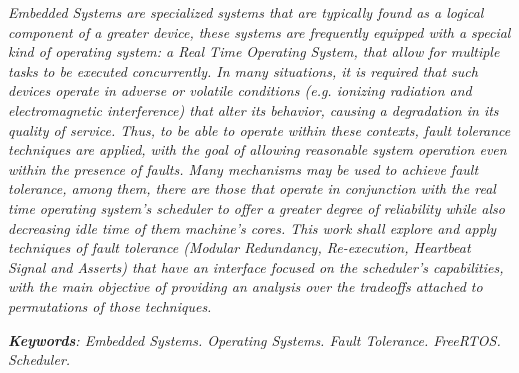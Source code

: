 \begin{Abstract}

\textit{Embedded Systems are specialized systems that are typically found as a logical component of a greater device, these systems are frequently equipped with a special kind of operating system: a Real Time Operating System, that allow for multiple tasks to be executed concurrently. In many situations, it is required that such devices operate in adverse or volatile conditions (e.g. ionizing radiation and electromagnetic interference) that alter its behavior, causing a degradation in its quality of service. Thus, to be able to operate within these contexts, fault tolerance techniques are applied, with the goal of allowing reasonable system operation even within the presence of faults. Many mechanisms may be used to achieve fault tolerance, among them, there are those that operate in conjunction with the real time operating system's scheduler to offer a greater degree of reliability while also decreasing idle time of them machine's cores. This work shall explore and apply techniques of fault tolerance (Modular Redundancy, Re-execution, Heartbeat Signal and Asserts) that have an interface focused on the scheduler's capabilities, with the main objective of providing an analysis over the tradeoffs attached to permutations of those techniques.}

\textit{\textbf{Keywords}: Embedded Systems. Operating Systems. Fault Tolerance. FreeRTOS. Scheduler.}

\end{Abstract}


